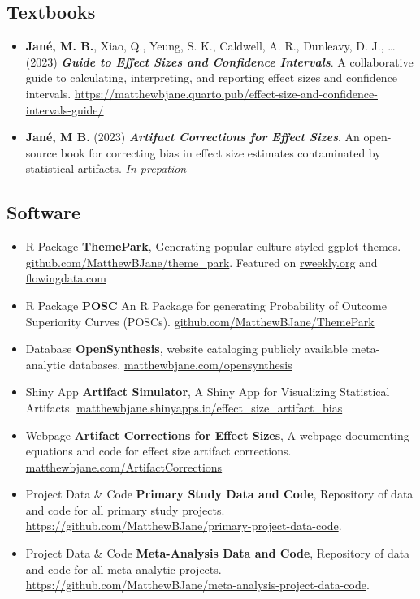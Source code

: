 \documentclass[
  letterpaper,
  DIV=11,
  numbers=noendperiod]{scrartcl}
\begin{document}
\subsection{\texorpdfstring{ Textbooks}{ Textbooks}}\label{textbooks}

\begin{itemize}
\item
  \textbf{Jané, M. B.}, Xiao, Q., Yeung, S. K., Caldwell, A. R.,
  Dunleavy, D. J., \ldots{} (2023) \textbf{\emph{Guide to Effect Sizes
  and Confidence Intervals}}. A collaborative guide to calculating,
  interpreting, and reporting effect sizes and confidence intervals.
  \url{https://matthewbjane.quarto.pub/effect-size-and-confidence-intervals-guide/}
\item
  \textbf{Jané, M B.} (2023) \textbf{\emph{Artifact Corrections for
  Effect Sizes}}. An open-source book for correcting bias in effect size
  estimates contaminated by statistical artifacts. \emph{In prepation}
\end{itemize}

\subsection{\texorpdfstring{ Software}{ Software}}\label{software}

\begin{itemize}
\item
  { R Package} \textbf{ThemePark}, Generating popular culture styled
  ggplot themes.
  \href{https://github.com/MatthewBJane/theme_park}{github.com/MatthewBJane/theme\_park}.
  Featured on \href{https://rweekly.org/2023-W32.html}{rweekly.org} and
  \href{https://flowingdata.com/2023/07/28/barbie-and-oppenheimer-themes-for-charts-in-r/}{flowingdata.com}
\item
  { R Package} \textbf{POSC} An R Package for generating Probability of
  Outcome Superiority Curves (POSCs).
  \href{https://github.com/MatthewBJane/ThemePark}{github.com/MatthewBJane/ThemePark}
\item
  { Database} \textbf{OpenSynthesis}, website cataloging publicly
  available meta-analytic databases.
  \href{https://matthewbjane.com/opensynthesis}{matthewbjane.com/opensynthesis}
\item
  { Shiny App} \textbf{Artifact Simulator}, A Shiny App for Visualizing
  Statistical Artifacts.
  \url{matthewbjane.shinyapps.io/effect_size_artifact_bias}
\item
  { Webpage} \textbf{Artifact Corrections for Effect Sizes}, A webpage
  documenting equations and code for effect size artifact corrections.
  \url{matthewbjane.com/ArtifactCorrections}
\item
  { Project Data \& Code} \textbf{Primary Study Data and Code},
  Repository of data and code for all primary study projects.
  \url{https://github.com/MatthewBJane/primary-project-data-code}.
\item
  { Project Data \& Code} \textbf{Meta-Analysis Data and Code},
  Repository of data and code for all meta-analytic projects.
  \url{https://github.com/MatthewBJane/meta-analysis-project-data-code}.
\end{itemize}
\end{document}
